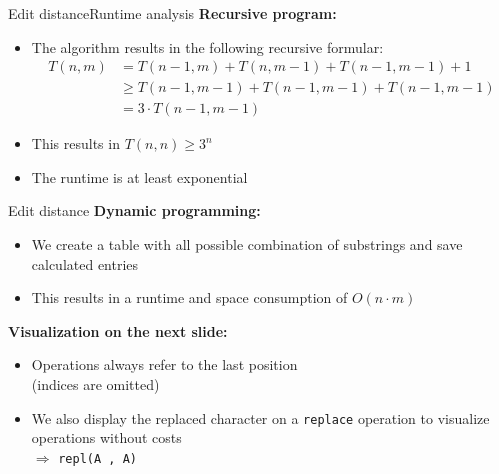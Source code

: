 


\begin{frame}{Edit distance}{Runtime analysis}
  \textbf{Recursive program:}
  \begin{itemize}
    \item<2->
      The algorithm results in the following recursive formular:
      \begin{align*}
        T(n, m) &= T(n-1, m) + T(n, m-1) + T(n-1, m-1) + 1\\
        & \geq T(n-1, m-1) + T(n-1, m-1) + T(n-1, m-1)\\
        & = 3 \cdot T(n-1, m-1)
      \end{align*}
    \item<3->
      This results in {\color{Mittel-Blau}$T(n, n) \geq 3^n$}
    \item<4->[$\Rightarrow$]
      The runtime is at least {\color{Mittel-Blau}exponential}
  \end{itemize}
\end{frame}


\begin{frame}{Edit distance}
  \textbf{Dynamic programming:}
  \begin{itemize}
    \item<2->
      We create a table with all possible combination of substrings and save
      calculated entries
    \item<2->
      This results in a runtime and space consumption of
      {\color{Mittel-Blau}$O(n \cdot m)$}
  \end{itemize}
  \vspace{1em}
  \textbf{Visualization on the next slide:}
  \begin{itemize}
    \item<4->
      Operations always refer to the last position\\
      (indices are omitted)
    \item<5->
      We also display the replaced character on a \texttt{replace} operation
      to visualize operations without costs\\
      $\Rightarrow$ \texttt{\color{Mittel-Blau}repl(\color{Mittel-Gruen}A%
        \color{Mittel-Blau}, \color{Mittel-Gruen}A\color{Mittel-Blau})}
  \end{itemize}
\end{frame}

